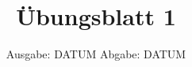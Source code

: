 

\title{Übungsblatt 1}
\date{%
  Ausgabe: DATUM %
  \hspace{3em}
  Abgabe: DATUM %
}



\maketitle
\thispagestyle{empty}
\tableofcontents
\newpage







